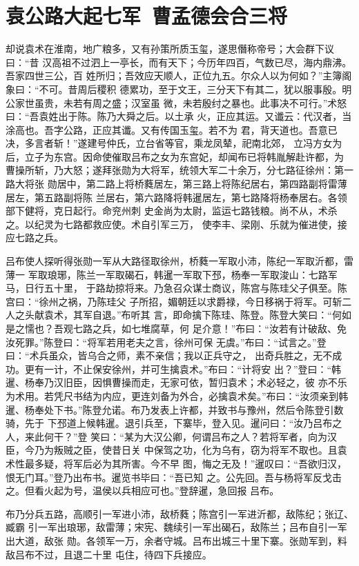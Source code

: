 \chapter{袁公路大起七军~曹孟德会合三将}

却说袁术在淮南，地广粮多，又有孙策所质玉玺，遂思僭称帝号；大会群下议曰：“昔
汉高祖不过泗上一亭长，而有天下；今历年四百，气数已尽，海内鼎沸。吾家四世三公，百
姓所归；吾效应天顺人，正位九五。尔众人以为何如？”主簿阁象曰：“不可。昔周后稷积
德累功，至于文王，三分天下有其二，犹以服事殷。明公家世虽贵，未若有周之盛；汉室虽
微，未若殷纣之暴也。此事决不可行。”术怒曰：“吾袁姓出于陈。陈乃大舜之后。以土承
火，正应其运。又谶云：代汉者，当涂高也。吾字公路，正应其谶。又有传国玉玺。若不为
君，背天道也。吾意已决，多言者斩！”遂建号仲氏，立台省等官，乘龙凤辇，祀南北郊，
立冯方女为后，立子为东宫。因命使催取吕布之女为东宫妃，却闻布已将韩胤解赴许都，为
曹操所斩，乃大怒；遂拜张勋为大将军，统领大军二十余万，分七路征徐州：第一路大将张
勋居中，第二路上将桥蕤居左，第三路上将陈纪居右，第四路副将雷薄居左，第五路副将陈
兰居右，第六路降将韩暹居左，第七路降将杨奉居右。各领部下健将，克日起行。命兖州刺
史金尚为太尉，监运七路钱粮。尚不从，术杀之。以纪灵为七路都救应使。术自引军三万，
使李丰、梁刚、乐就为催进使，接应七路之兵。

吕布使人探听得张勋一军从大路径取徐州，桥蕤一军取小沛，陈纪一军取沂都，雷薄一
军取琅琊，陈兰一军取碣石，韩暹一军取下邳，杨奉一军取浚山：七路军马，日行五十里，
于路劫掠将来。乃急召众谋士商议，陈宫与陈珪父子俱至。陈宫曰：“徐州之祸，乃陈珪父
子所招，媚朝廷以求爵禄，今日移祸于将军。可斩二人之头献袁术，其军自退。”布听其
言，即命擒下陈珪、陈登。陈登大笑曰：“何如是之懦也？吾观七路之兵，如七堆腐草，何
足介意！”布曰：“汝若有计破敌、免汝死罪。”陈登曰：“将军若用老夫之言，徐州可保
无虞。”布曰：“试言之。”登曰：“术兵虽众，皆乌合之师，素不亲信；我以正兵守之，
出奇兵胜之，无不成功。更有一计，不止保安徐州，并可生擒袁术。”布曰：“计将安
出？”登曰：“韩暹、杨奉乃汉旧臣，因惧曹操而走，无家可依，暂归袁术；术必轻之，彼
亦不乐为术用。若凭尺书结为内应，更连刘备为外合，必擒袁术矣。”布曰：“汝须亲到韩
暹、杨奉处下书。”陈登允诺。布乃发表上许都，并致书与豫州，然后令陈登引数骑，先于
下邳道上候韩暹。退引兵至，下寨毕，登入见。暹问曰：“汝乃吕布之人，来此何干？”登
笑曰：“某为大汉公卿，何谓吕布之人？若将军者，向为汉臣，今乃为叛贼之臣，使昔日关
中保驾之功，化为乌有，窃为将军不取也。且袁术性最多疑，将军后必为其所害。今不早
图，悔之无及！”暹叹曰：“吾欲归汉，恨无门耳。”登乃出布书。暹览书毕曰：“吾已知
之。公先回。吾与杨将军反戈击之。但看火起为号，温侯以兵相应可也。”登辞暹，急回报
吕布。

布乃分兵五路，高顺引一军进小沛，敌桥蕤；陈宫引一军进沂都，敌陈纪；张辽、臧霸
引一军出琅琊，敌雷薄；宋宪、魏续引一军出碣石，敌陈兰；吕布自引一军出大道，敌张
勋。各领军一万，余者守城。吕布出城三十里下寨。张勋军到，料敌吕布不过，且退二十里
屯住，待四下兵接应。

